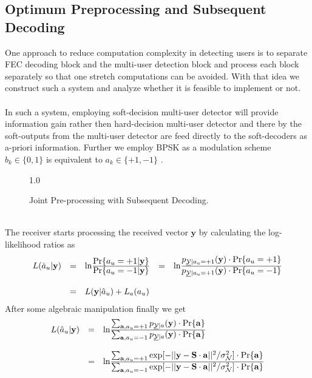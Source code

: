 \subsection{Optimum Preprocessing and Subsequent Decoding}
One approach to reduce computation complexity in detecting users is to separate FEC decoding block and the multi-user detection block and process each block separately so that one stretch computations can be avoided. With that idea we construct such a system and analyze whether it is feasible to implement or not. \\ \\ 
In such a system, employing soft-decision multi-user detector will provide information gain rather then hard-decision multi-user detector and there by the soft-outputs from the multi-user detector are feed directly to the soft-decoders as a-priori information. Further we employ BPSK as a modulation scheme $b_k\in\{0,1\}$ is equivalent to $a_k\in\{+1,-1\}$ \cite{K05}.
\begin{figure}[htb]
\centerline{  {1.0} }
\caption{Joint Pre-processing with Subsequent Decoding.}
\end{figure}\\
The receiver starts processing the received vector $\mathrm{\mathbf{y}}$ by calculating the log-likelihood ratios as
\begin{eqnarray}
\begin{array}{lllll}
L(\hat{a}_u\vert \mathrm{\mathbf{y}})&=&\mathrm{ln}\frac{\hbox{$\mathrm{Pr}\{a_u=+1 \vert \mathrm{\mathbf{y}}\}$}}{\hbox{$\mathrm{Pr}\{a_u=-1 \vert \mathrm{\mathbf{y}}\}$}}&=&\mathrm{ln}\frac{\hbox{$p_{\underline{\mathcal{Y}}\vert a_u=+1}(\mathrm{\mathbf{y}})\cdot \mathrm{Pr}\{a_u=+1\}$}}{\hbox{$p_{\underline{\mathcal{Y}}\vert a_u=+1}(\mathrm{\mathbf{y}})\cdot \mathrm{Pr}\{a_u=-1\}$}} \\ \\
&=&L(\mathrm{\mathbf{y}}\vert \hat{a}_u)+L_a(a_u)
\end{array}
\end{eqnarray}
After some algebraic manipulation finally we get
\begin{eqnarray}
\begin{array}{lll}
L(\hat{a}_u\vert \mathrm{\mathbf{y}})&=&
\mathrm{ln}
\frac
{\hbox{$\sum_{\mathrm{\mathbf{a}},a_u=+1}p_{\underline{\mathcal{Y}}\vert a}(\mathrm{\mathbf{y}})\cdot \mathrm{Pr}\{\mathrm{\mathbf{a}}\}$}}
{\hbox{$\sum_{\mathrm{\mathbf{a}},a_u=-1}p_{\underline{\mathcal{Y}}\vert a}(\mathrm{\mathbf{y}})\cdot \mathrm{Pr}\{\mathrm{\mathbf{a}}\}$}} \\ \\
&=&
\mathrm{ln}
\frac
{\hbox{$\sum_{\mathrm{\mathbf{a}},a_u=+1}\mathrm{exp}[-\vert\vert \mathrm{\mathbf{y}}-\mathrm{\mathbf{S}}\cdot \mathrm{\mathbf{a}}\vert \vert ^2 / \sigma^2_{\mathcal{N}}]\cdot \mathrm{Pr}\{\mathrm{\mathbf{a}}\}$}}
{\hbox{$\sum_{\mathrm{\mathbf{a}},a_u=-1}\mathrm{exp}[-\vert\vert \mathrm{\mathbf{y}}-\mathrm{\mathbf{S}}\cdot \mathrm{\mathbf{a}}\vert \vert ^2 / \sigma^2_{\mathcal{N}}]\cdot \mathrm{Pr}\{\mathrm{\mathbf{a}}\}$}}
\end{array}
\end{eqnarray}
